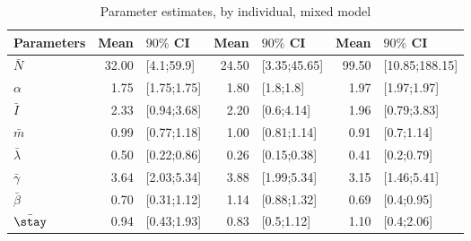 \begin{table}

\caption{\label{tab:}Parameter estimates, by individual, mixed model}
\centering
\begin{tabular}[t]{lrlrlrl}
\toprule
Parameters & Mean & $90\%$ CI & Mean & $90\%$ CI & Mean & $90\%$ CI\\
\midrule
$\bar{N}$ & 32.00 & [4.1;59.9] & 24.50 & [3.35;45.65] & 99.50 & [10.85;188.15]\\
$\alpha$ & 1.75 & [1.75;1.75] & 1.80 & [1.8;1.8] & 1.97 & [1.97;1.97]\\
$\bar{I}$ & 2.33 & [0.94;3.68] & 2.20 & [0.6;4.14] & 1.96 & [0.79;3.83]\\
$\bar{m}$ & 0.99 & [0.77;1.18] & 1.00 & [0.81;1.14] & 0.91 & [0.7;1.14]\\
$\bar{\lambda}$ & 0.50 & [0.22;0.86] & 0.26 & [0.15;0.38] & 0.41 & [0.2;0.79]\\
\addlinespace
$\bar{\gamma}$ & 3.64 & [2.03;5.34] & 3.88 & [1.99;5.34] & 3.15 & [1.46;5.41]\\
$\bar{\beta}$ & 0.70 & [0.31;1.12] & 1.14 & [0.88;1.32] & 0.69 & [0.4;0.95]\\
$\bar{\stay}$ & 0.94 & [0.43;1.93] & 0.83 & [0.5;1.12] & 1.10 & [0.4;2.06]\\
\bottomrule
\end{tabular}
\end{table}
